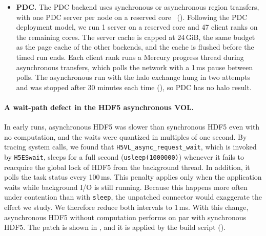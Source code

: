 \begin{itemize}
        \texttt{AsyncWrite} disabled, and the asynchronous mode uses
        \texttt{AsyncWrite=Guided}, in which the compute phase is bracketed
        with computation-block hints~\cite{godoy2020adios2}. Both modes use
        two-level shared-memory aggregation with 8 aggregators. With the
        default of one aggregator per node, a single process writes all of
        the data of the node, which limits BP5 to about a third of the
        bandwidth of POSIX on our single node. The engine setup is shown in
        \srcBpInit, the per-step path in \srcBpIssue, the hints in
        \srcBpHints, and the aggregation settings in \srcMatrixEnv.
  \item \textbf{PDC.} The PDC backend uses synchronous or asynchronous
        region transfers, with one PDC server per node on a reserved
        core~\cite{tang2018pdc} (\srcPdcIssue). Following the PDC
        deployment model, we run 1 server on a reserved core and 47 client
        ranks on the remaining cores. The server cache is capped at
        24\,GiB, the same budget as the page cache of the other backends,
        and the cache is flushed before the timed run ends. Each client
        rank runs a Mercury progress thread during asynchronous transfers,
        which polls the network with a 1\,ms pause between polls. The
        asynchronous run with the halo exchange hung in two attempts and
        was stopped after 30 minutes each time (\srcRunPdc), so PDC has no
        halo result.
\end{itemize}

\paragraph{A wait-path defect in the HDF5 asynchronous VOL.} In early
runs, asynchronous HDF5 was slower than synchronous HDF5 even with no
computation, and the waits were quantized in multiples of one second. By
tracing system calls, we found that \texttt{H5VL\_async\_request\_wait},
which is invoked by \texttt{H5ESwait}, sleeps for a full second
(\texttt{usleep(1000000)}) whenever it fails to reacquire the global lock of
HDF5 from the background thread. In addition, it polls the task status every
100\,ms. This penalty applies only when the application waits while
background I/O is still running. Because this happens more often under
contention than with \texttt{sleep}, the unpatched connector would
exaggerate the effect we study. We therefore reduce both intervals to 1\,ms.
With this change, asynchronous HDF5 without computation performs on par
with synchronous HDF5. The patch is shown in \srcVolPatch, and it is applied
by the build script (\srcBuildVol).
